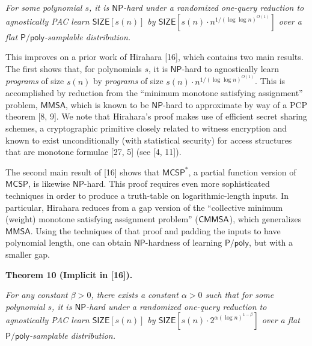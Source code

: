 \emph{For some polynomial $s$, it is ${\mathsf{NP}}$-hard under a randomized one-query reduction to agnostically PAC learn ${\mathsf{SIZE}}[s(n)]$ by ${\mathsf{SIZE}}[s(n)\cdot n^{1/(\log\log n)^{O(1)}}]$ over a flat ${\mathsf{P}}/{\mathsf{poly}}$-samplable distribution.}\par






This improves on a prior work of Hirahara [16], which contains two main results. The first shows that, for polynomials $s$, it is ${\mathsf{NP}}$-hard to agnostically learn \emph{programs} of size $s(n)$ by \emph{programs} of size $s(n)\cdot n^{1/(\log\log n)^{O(1)}}$. This is accomplished by reduction from the “minimum monotone satisfying assignment” problem, ${\mathsf{MMSA}}$, which is known to be ${\mathsf{NP}}$-hard to approximate by way of a PCP theorem [8, 9]. We note that Hirahara’s proof makes use of efficient secret sharing schemes, a cryptographic primitive closely related to witness encryption and known to exist unconditionally (with statistical security) for access structures that are monotone formulae [27, 5] (see [4, 11]).\par




The second main result of [16] shows that ${\mathsf{MCSP}}^{*}$, a partial function version of ${\mathsf{MCSP}}$, is likewise ${\mathsf{NP}}$-hard. This proof requires even more sophisticated techniques in order to produce a truth-table on logarithmic-length inputs. In particular, Hirahara reduces from a gap version of the “collective minimum (weight) monotone satisfying assignment problem” (${\sf CMMSA}$), which generalizes ${\mathsf{MMSA}}$. Using the techniques of that proof and padding the inputs to have polynomial length, one can obtain ${\mathsf{NP}}$-hardness of learning ${\mathsf{P}}/{\mathsf{poly}}$, but with a smaller gap.\par





\par\medskip\noindent\textbf{
\textbf{Theorem 10}\textbf{ }(Implicit in [16])\textbf{.}
}\par



\emph{For any constant $\beta>0$, there exists a constant $\alpha>0$ such that for some polynomial $s$, it is ${\mathsf{NP}}$-hard under a randomized one-query reduction to agnostically PAC learn ${\mathsf{SIZE}}[s(n)]$ by ${\mathsf{SIZE}}[s(n)\cdot 2^{\alpha(\log n)^{1-\beta}}]$ over a flat ${\mathsf{P}}/{\mathsf{poly}}$-samplable distribution.}\par



